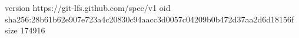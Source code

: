 version https://git-lfs.github.com/spec/v1
oid sha256:28b61b62e907e723a4c20830c94aacc3d0057c04209b0b472d37aa2d6d18156f
size 174916
